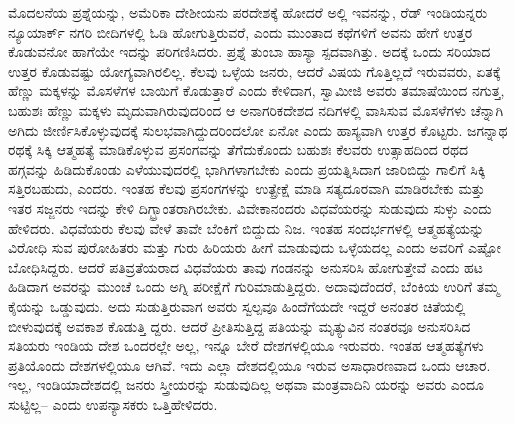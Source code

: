 ಮೊದಲನೆಯ ಪ್ರಶ್ನೆಯನ್ನು, ಅಮೆರಿಕಾ ದೇಶೀಯನು ಪರದೇಶಕ್ಕೆ ಹೋದರೆ ಅಲ್ಲಿ ಇವನನ್ನು, ರೆಡ್​ ಇಂಡಿಯನ್ನರು ನ್ಯೂಯಾರ್ಕ್​ ನಗರಿ ಬೀದಿಗಳಲ್ಲಿ ಓಡಿ ಹೋಗುತ್ತಿರುವರೆ, ಎಂದು ಮುಂತಾದ ಕಥೆಗಳಿಗೆ ಅವನು ಹೇಗೆ ಉತ್ತರ ಕೊಡುವನೋ ಹಾಗೆಯೇ ಇದನ್ನು ಪರಿಗಣಿಸಿದರು. ಪ್ರಶ್ನೆ ತುಂಬಾ ಹಾಸ್ಯಾ ಸ್ಪದವಾಗಿತ್ತು. ಅದಕ್ಕೆ ಒಂದು ಸರಿಯಾದ ಉತ್ತರ ಕೊಡುವಷ್ಟು ಯೋಗ್ಯವಾಗಿರಲಿಲ್ಲ. ಕೆಲವು ಒಳ್ಳೆಯ ಜನರು, ಆದರೆ ವಿಷಯ ಗೊತ್ತಿಲ್ಲದೆ ಇರುವವರು, ಏತಕ್ಕೆ ಹೆಣ್ಣು ಮಕ್ಕಳನ್ನು ಮೊಸಳೆಗಳ ಬಾಯಿಗೆ ಕೊಡುತ್ತಾರೆ ಎಂದು ಕೇಳಿದಾಗ, ಸ್ವಾಮೀಜಿ ಅವರು ತಮಾಷೆಯಿಂದ ನಗುತ್ತ, ಬಹುಶಃ ಹೆಣ್ಣು ಮಕ್ಕಳು ಮೃದುವಾಗಿರುವುದರಿಂದ ಆ ಅನಾಗರಿಕದೇಶದ ನದಿಗಳಲ್ಲಿ ವಾಸಿಸುವ ಮೊಸಳೆಗಳು ಚೆನ್ನಾಗಿ ಅಗಿದು ಜೀರ್ಣಿಸಿಕೊಳ್ಳುವುದಕ್ಕೆ ಸುಲಭವಾಗಿದ್ದುದರಿಂದಲೋ ಏನೋ ಎಂದು ಹಾಸ್ಯವಾಗಿ ಉತ್ತರ ಕೊಟ್ಟರು. ಜಗನ್ನಾಥ ರಥಕ್ಕೆ ಸಿಕ್ಕಿ ಆತ್ಮಹತ್ಯೆ ಮಾಡಿಕೊಳ್ಳುವ ಪ್ರಸಂಗವನ್ನು ತೆಗೆದುಕೊಂದು ಬಹುಶಃ ಕೆಲವರು ಉತ್ಸಾಹದಿಂದ ರಥದ ಹಗ್ಗವನ್ನು ಹಿಡಿದುಕೊಂಡು ಎಳೆಯುವುದರಲ್ಲಿ ಭಾಗಿಗಳಾಗಬೇಕು ಎಂದು ಪ್ರಯತ್ನಿಸಿದಾಗ ಜಾರಿಬಿದ್ದು ಗಾಲಿಗೆ ಸಿಕ್ಕಿ ಸತ್ತಿರಬಹುದು, ಎಂದರು. ಇಂತಹ ಕೆಲವು ಪ್ರಸಂಗಗಳನ್ನು ಉತ್ಪ್ರೇಕ್ಷೆ ಮಾಡಿ ಸತ್ಯದೂರವಾಗಿ ಮಾಡಿರಬೇಕು ಮತ್ತು ಇತರ ಸಜ್ಜನರು ಇದನ್ನು ಕೇಳಿ ದಿಗ್ಭ್ರಾಂತರಾಗಿರಬೇಕು. ವಿವೇಕಾನಂದರು ವಿಧವೆಯರನ್ನು ಸುಡುವುದು ಸುಳ್ಳು ಎಂದು ಹೇಳಿದರು. ವಿಧವೆಯರು ಕೆಲವು ವೇಳೆ ತಾವೇ ಬೆಂಕಿಗೆ ಬಿದ್ದುದು ನಿಜ. ಇಂತಹ ಸಂದರ್ಭಗಳಲ್ಲಿ ಆತ್ಮಹತ್ಯೆಯನ್ನು ವಿರೋಧಿ ಸುವ ಪುರೋಹಿತರು ಮತ್ತು ಗುರು ಹಿರಿಯರು ಹೀಗೆ ಮಾಡುವುದು ಒಳ್ಳೆಯದಲ್ಲ ಎಂದು ಅವರಿಗೆ ಎಷ್ಟೋ ಬೋಧಿಸಿದ್ದರು. ಆದರೆ ಪತಿವ್ರತೆಯರಾದ ವಿಧವೆಯರು ತಾವು ಗಂಡನನ್ನು ಅನುಸರಿಸಿ ಹೋಗುತ್ತೇವೆ ಎಂದು ಹಟ ಹಿಡಿದಾಗ ಅವರನ್ನು ಮುಂಚೆ ಒಂದು ಅಗ್ನಿ ಪರೀಕ್ಷೆಗೆ ಗುರಿಮಾಡುತ್ತಿದ್ದರು. ಅದಾವುದೆಂದರೆ, ಬೆಂಕಿಯ ಉರಿಗೆ ತಮ್ಮ ಕೈಯನ್ನು ಒಡ್ಡುವುದು. ಅದು ಸುಡುತ್ತಿರುವಾಗ ಅವರು ಸ್ವಲ್ಪವೂ ಹಿಂದೆಗೆಯದೇ ಇದ್ದರೆ ಅನಂತರ ಚಿತೆಯಲ್ಲಿ ಬೀಳುವುದಕ್ಕೆ ಅವಕಾಶ ಕೊಡುತ್ತಿ ದ್ದರು. ಆದರೆ ಪ್ರೀತಿಸುತ್ತಿದ್ದ ಪತಿಯನ್ನು ಮೃತ್ಯುವಿನ ನಂತರವೂ ಅನುಸರಿಸಿದ ಸತಿಯರು ಇಂಡಿಯ ದೇಶ ಒಂದರಲ್ಲೇ ಅಲ್ಲ, ಇನ್ನೂ ಬೇರೆ ದೇಶಗಳಲ್ಲಿಯೂ ಇರುವರು. ಇಂತಹ ಆತ್ಮಹತ್ಯೆಗಳು ಪ್ರತಿಯೊಂದು ದೇಶಗಳಲ್ಲಿಯೂ ಆಗಿವೆ. ಇದು ಎಲ್ಲಾ ದೇಶದಲ್ಲಿಯೂ ಇರುವ ಅಸಾಧಾರಣವಾದ ಒಂದು ಆಚಾರ. ಇಲ್ಲ, ಇಂಡಿಯಾದೇಶದಲ್ಲಿ ಜನರು ಸ್ತ್ರೀಯರನ್ನು ಸುಡುವುದಿಲ್ಲ ಅಥವಾ ಮಂತ್ರವಾದಿನಿ ಯರನ್ನು ಅವರು ಎಂದೂ ಸುಟ್ಟಿಲ್ಲ– ಎಂದು ಉಪನ್ಯಾಸಕರು ಒತ್ತಿಹೇಳಿದರು.

